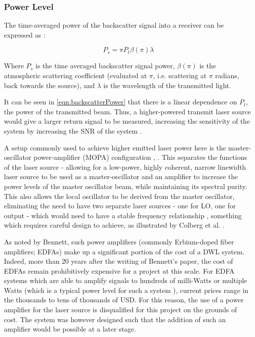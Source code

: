     \subsubsection{Power Level} 
    The time-averaged power of the backscatter signal into a receiver can be expressed as \cite{hill_remote_nodate}:
    
        \begin{equation}
            P_s = \pi P_t \beta(\pi) \lambda
            \label{eqn:backscatterPower}
        \end{equation}

    Where $P_s$ is the time averaged backscatter signal power, $\beta(\pi)$ is the atmospheric scattering coefficient (evaluated at $\pi$, i.e. scattering at $\pi$ radians, back towards the source), and $\lambda$ is the wavelength of the transmitted light.
    
    It can be seen in \autoref{eqn:backscatterPower} that there is a linear dependence on $P_t$, the power of the transmitted beam. Thus, a higher-powered transmit laser source would give a larger return signal to be measured, increasing the sensitivity of the system by increasing the SNR of the system \cite{bennett_doppler_2003}. 

    A setup commonly used to achieve higher emitted laser power here is the master-oscillator power-amplifier (MOPA) configuration \cite{cariou2006laser}, \cite{bennett_doppler_2003}. This separates the functions of the laser source - allowing for a low-power, highly coherent, narrow linewidth laser source to be used as a master-oscillator and an amplifier to increase the power levels of the master oscillator beam, while maintaining its spectral purity. This also allows the local oscillator to be derived from the master oscillator, eliminating the need to have two separate laser sources - one for LO, one for output - which would need to have a stable frequency relationship \cite{cariou2006laser}, something which requires careful design to achieve, as illustrated by Colberg et al. \cite{colberg_diode-laser-based_2026}.  

    As noted by Bennett, such power amplifiers (commonly Erbium-doped fiber amplifiers; EDFAs) make up a significant portion of the cost of a DWL system. Indeed, more than 20 years after the writing of Bennett's paper, the cost of EDFAs remain prohibitively expensive for a project at this scale. For EDFA systems which are able to amplify signals to hundreds of milli-Watts or multiple Watts (which is a typical power level for such a system \cite{abdelazim_development_2015}\cite{cariou_leosphere_nodate}\cite{cariou2006laser}), current prices range in the thousands to tens of thousands of USD. For this reason, the use of a power amplifier for the laser source is disqualified for this project on the grounds of cost. The system was however designed such that the addition of such an amplifier would be possible at a later stage.
     
